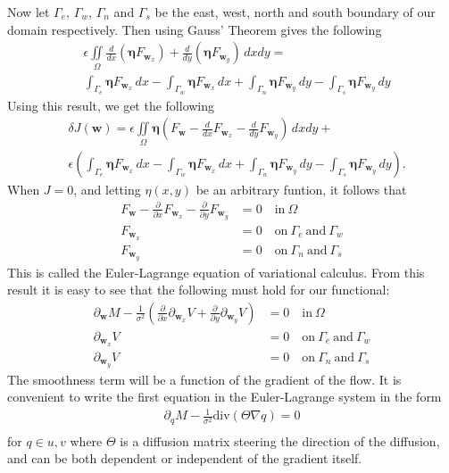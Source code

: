 \documentclass[10pt,a4paper]{article}
\begin{document}
Now let $\Gamma_{e}$, $\Gamma_{w}$, $\Gamma_{n}$ and $\Gamma_{s}$ be the east, west, north and south boundary of our domain respectively. Then using Gauss' Theorem gives the following
\begin{align*}
&\epsilon \iint \limits_{\Omega}  \frac{d}{d x} (\bm{\eta} F_{\textbf{w}_x}) + \frac{d }{d y} (\bm{\eta} F_{\textbf{w}_y}) \, dxdy = \\ &\int_{\Gamma_{e}} \bm{\eta} F_{\textbf{w}_x} \, dx - \int_{\Gamma_{w}} \bm{\eta} F_{\textbf{w}_x} \, dx + \int_{\Gamma_{n}} \bm{\eta} F_{\textbf{w}_y} \, dy - \int_{\Gamma_{s}} \bm{\eta} F_{\textbf{w}_y} \, dy
\end{align*}
Using this result, we get the following
\begin{align*}
&\delta J(\textbf{w}) = \epsilon \iint \limits_{\Omega} \bm{\eta} \left( F_\textbf{w} -  \frac{d}{d x} F_{\textbf{w}_x} - \frac{d }{d y} F_{\textbf{w}_y} \right) \, dxdy + \\ &\epsilon \left( \int_{\Gamma_{e}} \bm{\eta} F_{\textbf{w}_x} \, dx - \int_{\Gamma_{w}} \bm{\eta} F_{\textbf{w}_x} \, dx + \int_{\Gamma_{n}} \bm{\eta} F_{\textbf{w}_y} \, dy - \int_{\Gamma_{s}} \bm{\eta} F_{\textbf{w}_y} \, dy \right).
\end{align*}
When $J = 0$, and letting $\eta(x,y)$ be an arbitrary funtion, it follows that
\begin{align*}
F_{\textbf{w}} - \frac{\partial}{\partial x} F_{\textbf{w}_x} - \frac{\partial }{\partial y} F_{\textbf{w}_y} &= 0 \quad \text{in} \ \Omega \\
F_{\textbf{w}_x} &= 0 \quad \text{on} \ \Gamma_e \ \text{and} \ \Gamma_w \\
F_{\textbf{w}_y}& = 0 \quad \text{on} \ \Gamma_n \ \text{and} \ \Gamma_s
\end{align*}
This is called the Euler-Lagrange equation of variational calculus. From this result it is easy to see that the following must hold for our functional:
\begin{equation}
\label{EL}
  \begin{aligned}
\partial_{\textbf{w}} M - \frac{1}{\sigma^2}\left( \frac{\partial}{\partial x} \partial_{\textbf{w}_x} V + \frac{\partial}{\partial y} \partial_{\textbf{w}_y} V \right) &= 0 \quad \text{in} \ \Omega  \\
\partial_{\textbf{w}_x} V &= 0 \quad \text{on} \ \Gamma_e \ \text{and} \ \Gamma_w \\
\partial_{\textbf{w}_y} V &= 0 \quad \text{on} \ \Gamma_n \ \text{and} \ \Gamma_s
  \end{aligned}
\end{equation}
The smoothness term will be a function of the gradient of the flow. It is convenient to write the first equation in the Euler-Lagrange system in the form
\begin{equation}
\label{EL_regu}
  \begin{aligned}
\partial_q M - \frac{1}{\sigma^2} \text{div} \left(\Theta \nabla q \right) = 0 \\
	\end{aligned}
\end{equation}
for $q \in u, v$ where $\Theta$ is a diffusion matrix steering the direction of the diffusion, and can be both dependent or independent of the gradient itself.
\end{document}
